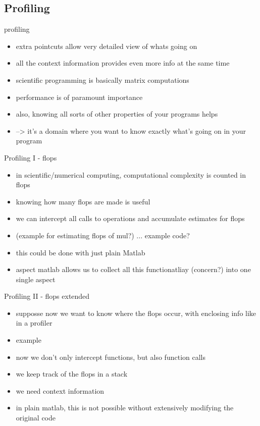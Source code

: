 \subsection*{Profiling}
 profiling
  \begin{itemize}
  \item extra pointcuts allow very detailed view of whats going on
  \item all the context information provides even more info
       at the same time
   \item scientific programming is basically matrix computations
   \item performance is of paramount importance
    \item also, knowing all sorts of other properties of your programs helps
    \item --> it's a domain where you want to know exactly what's going on in your program
  \end{itemize}
\begin{frame}{Profiling I - flops}
  \begin{itemize}
  \item in scientific/numerical computing, computational complexity is
  counted in flops
  \item knowing how many flops are made is useful
  \item we can intercept all calls to operations and accumulate
  estimates for flops
  \item (example for estimating flops of mul?) ... example code?
  \item this could be done with just plain Matlab
  \item aspect matlab allows us to collect all this functionatliay
  (concern?) into one single aspect
  \end{itemize}
\end{frame}

\begin{frame}{Profiling II - flops extended}
  \begin{itemize}
  \item supposse now we want to know where the flops occur, with
  enclosing info like in a profiler
  \item example
  \item now we don't only intercept functions, but also function calls
  \item we keep track of the flops in a stack
  \item we need context information
  \item in plain matlab, this is not possible without extensively
  modifying the original code
  \end{itemize}
\end{frame}


